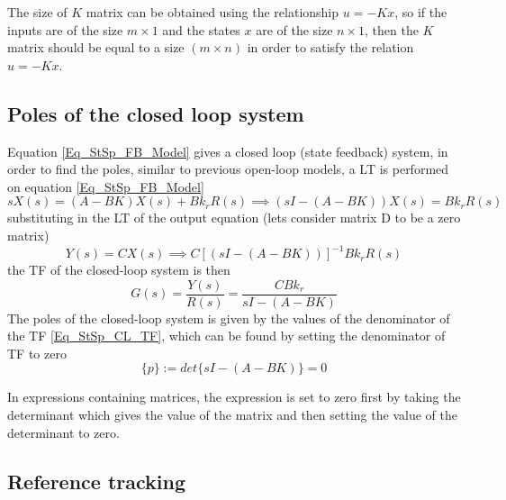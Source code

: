 The size of $K$ matrix can be obtained using the relationship $u = - K x$, so if the inputs are of the size $m \times 1$ and the states $x$ are of the size $n \times 1$, then the $K$ matrix should be equal to a size $(m \times n)$ in order to satisfy the relation $u = - K x$.

\subsection{Poles of the closed loop system}

Equation \eqref{Eq_StSp_FB_Model} gives a closed loop (state feedback) system, in order to find the poles, similar to previous open-loop models, a LT is performed on equation \eqref{Eq_StSp_FB_Model}
\begin{equation}
	s X(s) = (A - B K) X(s) + B k_r R(s) \implies (sI - (A - BK))X(s) = B k_r R(s)
\end{equation}
substituting in the LT of the output equation (lets consider matrix D to be a zero matrix)
\begin{equation}
	Y(s) = C X(s) \implies C [(sI - (A - BK))]^{-1} B k_r R(s)
\end{equation}
the TF of the closed-loop system is then
\begin{equation} \label{Eq_StSp_CL_TF}
	G(s) = \frac{Y(s)}{R(s)} = \frac{C B k_r}{sI - (A - BK)}
\end{equation}
The poles of the closed-loop system is given by the values of the denominator of the TF \eqref{Eq_StSp_CL_TF}, which can be found by setting the denominator of TF to zero
\begin{equation} \label{Eq_StSp_CL_Poles}
	\{p\} := det\{sI - (A - BK)\} = 0
\end{equation}

In expressions containing matrices, the expression is set to zero first by taking the determinant which gives the value of the matrix and then setting the value of the determinant to zero.

\subsection{Reference tracking}

